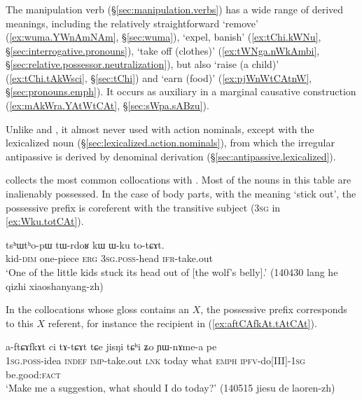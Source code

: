 \subsubsection{ } \label{sec:tCAt.lv}
The manipulation verb  (§\ref{sec:manipulation.verbs}) has a wide range of derived meanings, including the relatively straightforward `remove' (\ref{ex:wuma.YWnAmNAm}, §\ref{sec:wuma}), `expel, banish' (\ref{ex:tChi.kWNu}, §\ref{sec:interrogative.pronouns}), `take off (clothes)' (\ref{ex:tWNga.nWkAmbi}, §\ref{sec:relative.possessor.neutralization}), but also `raise (a child)' (\ref{ex:tChi.tAkWsci}, §\ref{sec:tChi}) and `earn (food)' (\ref{ex:pjWnWtCAtnW}, §\ref{sec:pronouns.emph}). It occurs as auxiliary in a marginal causative construction (\ref{ex:mAkWra.YAtWtCAt}, §\ref{sec:sWpa.sABzu}).

Unlike  and , it almost never used with  action nominals, except with the lexicalized noun  (§\ref{sec:lexicalized.action.nominals}), from which the irregular antipassive  is derived by denominal derivation (§\ref{sec:antipassive.lexicalized}).

 collects the most common collocations with . Most of the nouns in this table are inalienably possessed. In the case of body parts, with the meaning `stick out', the possessive prefix is coreferent with the transitive subject (\textsc{3sg} in \ref{ex:Wku.totCAt}).

\begin{exe}
\ex \label{ex:Wku.totCAt}
\gll tsʰɯtʰo-pɯ tɯ-rdoʁ kɯ ɯ-ku to-tɕɤt. \\
kid-\textsc{dim} one-piece \textsc{erg} \textsc{3sg}.\textsc{poss}-head \textsc{ifr}-take.out \\
\glt `One of the little kids stuck its head out of [the wolf's belly].' (140430 lang he qizhi xiaoshanyang-zh)
\end{exe}

In the collocations whose gloss contains an $X$, the possessive prefix corresponds to this $X$ referent, for instance the recipient in  (\ref{ex:aftCAfkAt.tAtCAt}).

\begin{exe}
\ex \label{ex:aftCAfkAt.tAtCAt}
\gll  a-ftɕɤfkɤt ci tɤ-tɕɤt tɕe jisŋi tɕʰi ʑo ɲɯ-nɤme-a pe \\
\textsc{1sg}.\textsc{poss}-idea \textsc{indef} \textsc{imp}-take.out \textsc{lnk} today what \textsc{emph} \textsc{ipfv}-do[III]-\textsc{1sg} be.good:\textsc{fact}  \\
\glt `Make me a suggestion, what should I do today?' (140515 jiesu de laoren-zh)
\end{exe}



